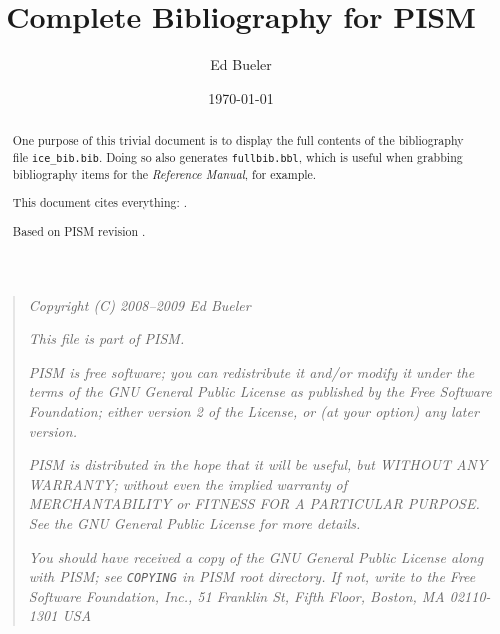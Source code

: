 \documentclass[10pt,final]{amsart}
\title{Complete Bibliography for PISM}
\author{Ed Bueler}
\date{\today}
\newcommand{\PISMREV}{}
\begin{document}
\begin{abstract}
One purpose of this trivial document is to display the full contents of the 
bibliography file \texttt{ice\_bib.bib}.  Doing so also generates \texttt{fullbib.bbl}, 
which is useful when grabbing bibliography items for the \emph{Reference Manual}, 
for example.

This document cites everything: \cite{*}.

Based on PISM revision \PISMREV.
\end{abstract}

\maketitle

\scriptsize
\begin{quote}
\textsl{Copyright (C) 2008--2009 Ed Bueler}
\medskip

\noindent \textsl{This file is part of PISM.}
\medskip

\noindent \textsl{PISM is free software; you can redistribute it and/or modify it under the terms of the GNU General Public
  License as published by the Free Software Foundation; either version 2 of the License, or (at your option) any later version.}
\medskip

\noindent \textsl{PISM is distributed in the hope that it will be useful, but WITHOUT ANY WARRANTY; without even the implied
  warranty of MERCHANTABILITY or FITNESS FOR A PARTICULAR PURPOSE. See the GNU General Public License for more details.} \medskip

\noindent \textsl{You should have received a copy of the GNU General Public License along
  with PISM; see \emph{\texttt{COPYING}} in PISM root directory. If not, write to the Free Software Foundation, Inc., 51 Franklin
  St, Fifth Floor, Boston, MA 02110-1301 USA}
\end{quote}
\normalsize

\bigskip



\end{document}
